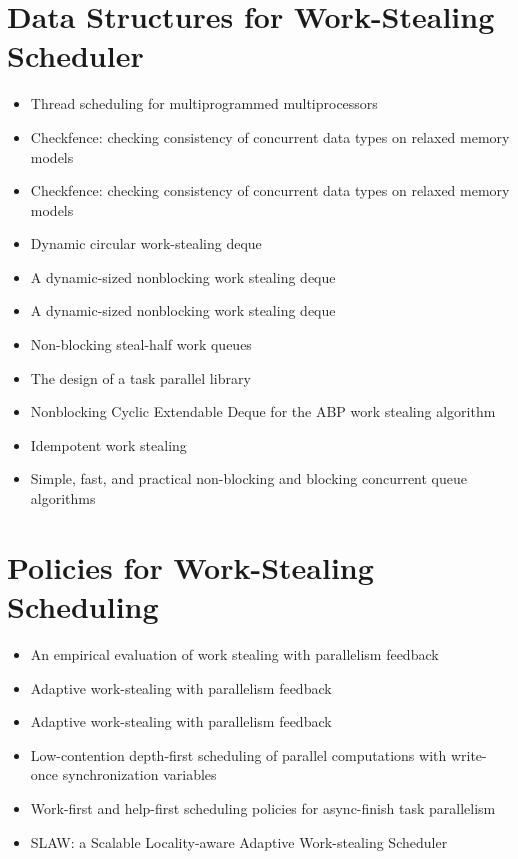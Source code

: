 \section*{Data Structures for Work-Stealing Scheduler}
\label{sec:lr-data-structures-for-work-stealing-scheduler}

\begin{itemize}
\item Thread scheduling for multiprogrammed multiprocessors
  \cite{Arora2001}
\item Checkfence: checking consistency of concurrent data types on
  relaxed memory models \cite{Burckhardt2007}
\item Checkfence: checking consistency of concurrent data types on
  relaxed memory models \cite{Burckhardt2007a}
\item Dynamic circular work-stealing deque \cite{Chase2005}
\item A dynamic-sized nonblocking work stealing deque
  \cite{Hendler2006}
\item A dynamic-sized nonblocking work stealing deque
  \cite{Hendler2006a}
\item Non-blocking steal-half work queues \cite{Hendler2002}
\item The design of a task parallel library \cite{Leijen2009}
\item Nonblocking Cyclic Extendable Deque for the ABP work stealing
  algorithm \cite{Lev2005}
\item Idempotent work stealing \cite{Michael2009}
\item Simple, fast, and practical non-blocking and blocking concurrent
  queue algorithms \cite{Michael1996}
\end{itemize}


\section*{Policies for Work-Stealing Scheduling}
\label{sec:lr-policies-for-work-stealing-scheduling}

\begin{itemize}
\item An empirical evaluation of work stealing with parallelism
  feedback \cite{Agrawal2006}
\item Adaptive work-stealing with parallelism feedback
  \cite{Agrawal2008}
\item Adaptive work-stealing with parallelism feedback
  \cite{Agrawal2008a}
\item Low-contention depth-first scheduling of parallel computations
  with write-once synchronization variables \cite{Fatourou2001}
\item Work-first and help-first scheduling policies for async-finish
  task parallelism \cite{Guo2009}
\item SLAW: a Scalable Locality-aware Adaptive Work-stealing Scheduler
  \cite{Guo2010}
\end{itemize}


